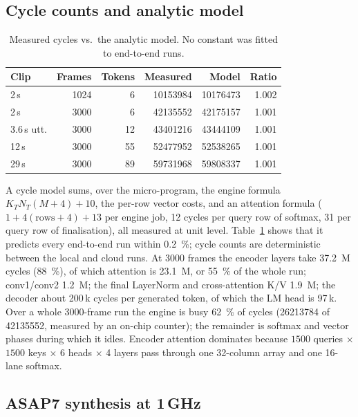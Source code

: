 \documentclass[conference]{IEEEtran}
\begin{document}
\subsection{Cycle counts and analytic model}
\begin{table}[t]
\caption{Measured cycles vs.\ the analytic model. No constant was fitted to end-to-end runs.}
\label{tab:cycles}
\centering\small
\begin{tabular}{@{}lrrrrr@{}}
\toprule
Clip & Frames & Tokens & Measured & Model & Ratio \\
\midrule
2\,s & 1024 & 6 & \num{10153984} & \num{10176473} & 1.002 \\
2\,s & 3000 & 6 & \num{42135552} & \num{42175157} & 1.001 \\
3.6\,s utt. & 3000 & 12 & \num{43401216} & \num{43444109} & 1.001 \\
12\,s & 3000 & 55 & \num{52477952} & \num{52538265} & 1.001 \\
29\,s & 3000 & 89 & \num{59731968} & \num{59808337} & 1.001 \\
\bottomrule
\end{tabular}
\end{table}

A cycle model sums, over the micro-program, the engine formula $K_TN_T(M+4)+10$, the per-row vector costs, and an attention formula ($1+4(\mathrm{rows}+4)+13$ per engine job, 12 cycles per query row of softmax, 31 per query row of finalisation), all measured at unit level. Table~\ref{tab:cycles} shows that it predicts every end-to-end run within \SI{0.2}{\percent}; cycle counts are deterministic between the local and cloud runs. At 3000 frames the encoder layers take \SI{37.2}{M} cycles (\SI{88}{\percent}), of which attention is \SI{23.1}{M}, or \SI{55}{\percent} of the whole run; conv1/conv2 \SI{1.2}{M}; the final LayerNorm and cross-attention K/V \SI{1.9}{M}; the decoder about \num{200}\,k cycles per generated token, of which the LM head is \num{97}\,k. Over a whole 3000-frame run the engine is busy \SI{62}{\percent} of cycles (\num{26213784} of \num{42135552}, measured by an on-chip counter); the remainder is softmax and vector phases during which it idles. Encoder attention dominates because $1500$ queries $\times$ $1500$ keys $\times$ 6 heads $\times$ 4 layers pass through one 32-column array and one 16-lane softmax.

\subsection{ASAP7 synthesis at 1\,GHz}\label{sec:synth}
\begin{table}[t]
\caption{Logic synthesis on ASAP7 (7.5-track RVT, TT corner) with Yosys~0.33/ABC, \SI{1000}{ps} delay target; memories black-boxed. Critical path is ABC's post-mapping register-to-register delay before setup and clock-to-Q (about \SI{60}{ps} in ASAP7).}
\label{tab:synth}
\centering\small
{}
\end{table}
\end{document}
